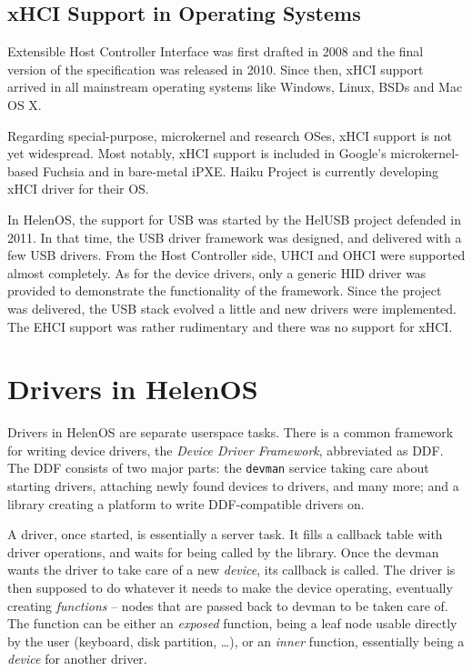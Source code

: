 \subsection{xHCI Support in Operating Systems}
\label{subsect:support-in-oses}

Extensible Host Controller Interface was first drafted in 2008 and the final
version of the specification was released in 2010. Since then, xHCI support
arrived in all mainstream operating systems like Windows, Linux, BSDs and Mac
OS X.

Regarding special-purpose, microkernel and research OSes, xHCI support is not
yet widespread.  Most notably, xHCI support is included in Google's
microkernel-based Fuchsia and in bare-metal iPXE.  Haiku Project is currently
developing xHCI driver for their OS.

In HelenOS, the support for USB was started by the HelUSB project defended in 2011. In that
time, the USB driver framework was designed, and delivered with a few USB
drivers. From the Host Controller side, UHCI and OHCI were supported almost
completely. As for the device drivers, only a generic HID driver was provided
to demonstrate the functionality of the framework. Since the project was
delivered, the USB stack evolved a little and new drivers were implemented.
The EHCI support was rather rudimentary and there was no support for xHCI.

\section{Drivers in HelenOS}

Drivers in HelenOS are separate userspace tasks. There is a common framework
for writing device drivers, the \emph{Device Driver Framework}, abbreviated as
DDF. The DDF consists of two major parts: the \texttt{devman} service taking
care about starting drivers, attaching newly found devices to drivers, and many
more; and a  library creating a platform to write DDF-compatible
drivers on.

A driver, once started, is essentially a server task. It fills a callback table
with driver operations, and waits for being called by the library. Once the
devman wants the driver to take care of a new \emph{device}, its
 callback is called. The driver is then supposed to do whatever
it needs to make the device operating, eventually creating \emph{functions} --
nodes that are passed back to devman to be taken care of. The function can be
either an \emph{exposed} function, being a leaf node usable directly by the user
(keyboard, disk partition, \dots), or an \emph{inner} function, essentially
being a \textit{device} for another driver.

